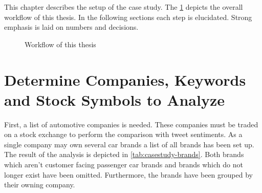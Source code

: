 
This chapter describes the setup of the case study.
The \cref{fig:casestudy-workflow} depicts the overall workflow of this thesis.
In the following sections each step is elucidated.
Strong emphasis is laid on numbers and decisions.

\begin{figure}[ht]
  \centering

  \caption{Workflow of this thesis}
  \label{fig:casestudy-workflow}
\end{figure}

\section{Determine Companies, Keywords and Stock Symbols to Analyze}
\label{s:casestudy-companieskeywords}

First, a list of automotive companies is needed.
These companies must be traded on a stock exchange to perform the comparison with tweet sentiments.
As a single company may own several car brands a list of all brands has been set up.
The result of the analysis is depicted in \cref{tab:casestudy-brands}.
Both brands which aren't customer facing passenger car brands and brands which do not longer exist have been omitted.
Furthermore, the brands have been grouped by their owning company.

